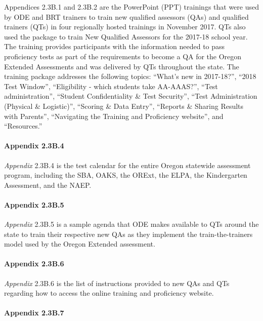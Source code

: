 \documentclass[]{article}
\let\oldparagraph\paragraph
\renewcommand{\paragraph}[1]{\oldparagraph{#1}\mbox{}}
\begin{document}
Appendices 2.3B.1 and 2.3B.2 are the PowerPoint (PPT) trainings that
were used by ODE and BRT trainers to train new qualified assessors (QAs)
and qualified trainers (QTs) in four regionally hosted trainings in
November 2017. QTs also used the package to train New Qualified
Assessors for the 2017-18 school year. The training provides
participants with the information needed to pass proficiency tests as
part of the requirements to become a QA for the Oregon Extended
Assessments and was delivered by QTs throughout the state. The training
package addresses the following topics: ``What's new in 2017-18?'',
``2018 Test Window'', ``Eligibility - which students take AA-AAAS?'',
``Test administration'', ``Student Confidentiality \& Test Security'',
``Test Administration (Physical \& Logistic)'', ``Scoring \& Data
Entry'', ``Reports \& Sharing Results with Parents'', ``Navigating the
Training and Proficiency website'', and ``Resources.''

\paragraph{Appendix 2.3B.4}\label{appendix-2.3b.4}

\emph{Appendix} 2.3B.4 is the test calendar for the entire Oregon
statewide assessment program, including the SBA, OAKS, the ORExt, the
ELPA, the Kindergarten Assessment, and the NAEP.

\paragraph{Appendix 2.3B.5}\label{appendix-2.3b.5}

\emph{Appendix} 2.3B.5 is a sample agenda that ODE makes available to
QTs around the state to train their respective new QAs as they implement
the train-the-trainers model used by the Oregon Extended assessment.

\paragraph{Appendix 2.3B.6}\label{appendix-2.3b.6}

\emph{Appendix} 2.3B.6 is the list of instructions provided to new QAs
and QTs regarding how to access the online training and proficiency
website.

\paragraph{Appendix 2.3B.7}\label{appendix-2.3b.7}
\end{document}

